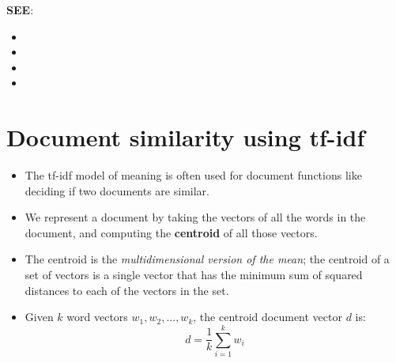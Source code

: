 \noindent \textbf{SEE}:
\begin{itemize}
    \item {}
    \item {}
    \item {}
    \item {}
\end{itemize}


\section{Document similarity using tf-idf}
\begin{itemize}
    \item The tf-idf model of meaning is often used for document functions like deciding if two documents are similar.

    \item We represent a document by taking the vectors of all the words in the document, and computing the \textbf{centroid} of all those vectors.
    
    \item The centroid is the \textit{multidimensional version of the mean}; the centroid of a set of vectors is a single vector that has the minimum sum of squared distances to each of the vectors in the set.

    \item Given $k$ word vectors $w_1,w_2,...,w_k$, the centroid document vector $d$ is:
    \[
        \displaystyle d = \frac{1}{k}\displaystyle\sum_{i=1}^{k} w_i
    \]

    

\end{itemize}


































